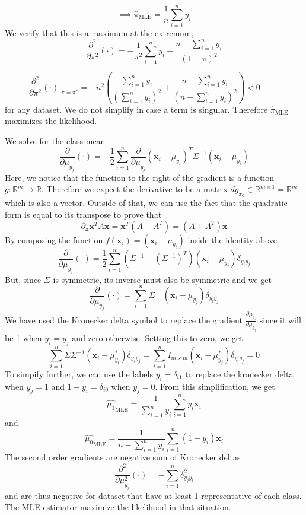 \documentclass{article}
\numberwithin{equation}{section}
\begin{document}
$$
\implies \boxed{\hat{\pi}_{\text{MLE}} = \frac{1}{n} \sum_{i = 1}^n y_i }
$$
We verify that this is a maximum at the extremum,
$$
\frac{\partial^2 }{\partial \pi^2} (\cdot) = -\frac{1}{\pi^2}\sum_{i = 1}^n y_i
 - \frac{n - \sum_{i = 1}^n y_i}{(1 - \pi)^2}
$$

$$
 \frac{\partial^2 }{\partial \pi^2} (\cdot)\bigg|_{\pi = \pi^*} = -n^2 \left(\frac{\sum_{i = 1}^n y_i}{(\sum_{i = 1}^n y_i)^2} + \frac{n - \sum_{i = 1}^n y_i}{(n - \sum_{i = 1}^n y_i)^2} \right) < 0 \hspace{1cm}
$$
for any dataset. We do not simplify in case a term is singular. Therefore $\hat{\pi}_{\text{MLE}}$ maximizes the likelihood.

We solve for the class mean
$$
\frac{\partial }{\partial \mu_{y_j}} (\cdot) = -\frac{1}{2} \sum_{i =1}^n  \frac{\partial }{\partial \mu_{y_j}}(\mathbf{x}_i - \mu_{y_i})^T\Sigma^{-1} (\mathbf{x}_i - \mu_{y_i})
$$
Here, we notice that the function to the right of the gradient is a function
$g: \mathbb{R}^m \rightarrow \mathbb{R}$. Therefore we expect the derivative to be a matrix $dg_{x_0} \in \mathbb{R}^{m \times 1} = \mathbb{R}^m$ which is also a vector. Outside of that, we can use the fact that the quadratic form is equal to its transpose to prove that
$$\partial_\mathbf{x} \mathbf{x}^T A \mathbf{x} = \mathbf{x}^T(A + A^T) = (A + A^T)\mathbf{x}$$
By composing the function $f(\mathbf{x}_i) = (\mathbf{x}_i - \mu_{y_i})$ inside the identity above
$$
\frac{\partial }{\partial \mu_{y_j}} (\cdot) = \frac{1}{2} \sum_{i =1}^n  (\Sigma^{-1} + (\Sigma^{-1})^T)(\mathbf{x}_i - \mu_{y_j}) \delta_{y_i y_j}
$$
But, since $\Sigma$ is symmetric, its inverse must also be symmetric and we get
$$
\frac{\partial }{\partial \mu_{y_j}} (\cdot) = \sum_{i =1}^n  \Sigma^{-1}(\mathbf{x}_i - \mu_{y_j})\delta_{y_i y_j}
$$
We have used the Kronecker delta symbol to replace the gradient $\frac{\partial \mu_{y_i}}{\partial \mu_{y_j}}$ since it will be 1 when $y_i = y_j$ and zero otherwise.
Setting this to zero, we get
$$
\sum_{i =1}^n  \Sigma \Sigma^{-1}(\mathbf{x}_i - \mu_{y_i}^*)\delta_{y_i y_j} = \sum_{i =1}^n  I_{m\times m}(\mathbf{x}_i - \mu_{y_j}^*)\delta_{y_i y_j} = 0
$$
To simpify further, we can use the labels $y_i = \delta_{i1}$ to replace the kronecker delta when $y_j = 1$ and $1 - y_i = \delta_{i0}$ when $y_j = 0$. From this simplification, we get
$$
\boxed{\hat{\mu_1}_{\text{MLE}} = \frac{1}{\sum_{i = 1}^n y_i}\sum_{i = 1}^n y_i \mathbf{x}_i }
$$
and
$$
\boxed{\hat{\mu_0}_{\text{MLE}} = \frac{1}{n - \sum_{i = 1}^n y_i}\sum_{i = 1}^n (1 - y_i)\mathbf{x}_i }
$$
The second order gradients are negative sum of Kronecker deltas
$$
\frac{\partial^2}{\partial \mu_{y_j}^2}(\cdot) = -\sum_{i = 1}^n \delta_{y_j y_i}^2
$$
and are thus negative for dataset that have at least 1 representative of each class. The MLE estimator maximize the likelihood in that situation.
\end{document}
